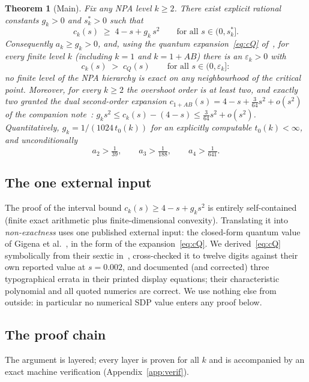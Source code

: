\documentclass[11pt]{article}
\newtheorem{theorem}{Theorem}[section]
\newcommand{\eps}{\varepsilon}
\begin{document}
\begin{theorem}[Main]\label{thm:main}
Fix any NPA level $k\ge2$. There exist explicit rational constants $g_k>0$
and $s^\ast_k>0$ such that
\[
c_k(s)\;\ge\;4-s+g_k\,s^2\qquad\text{for all }s\in(0,s^\ast_k].
\]
Consequently $a_k\ge g_k>0$, and, using the quantum
expansion~\eqref{eq:cQ} of~\cite{Gigena}, for every finite level $k$
(including $k=1$ and $k=1{+}AB$) there is an $\eps_k>0$ with
\[
c_k(s)\;>\;c_Q(s)\qquad\text{for all }s\in(0,\eps_k]:
\]
no finite level of the NPA hierarchy is exact on any neighbourhood of the
critical point. Moreover, for every $k\ge2$ the overshoot order is at least
two, and exactly two granted the dual second-order expansion
$c_{1+AB}(s)=4-s+\tfrac3{64}s^2+o(s^2)$ of the companion
note~\cite{overshoot}:
$g_k s^2\le c_k(s)-(4-s)\le\tfrac3{64}s^2+o(s^2)$.
Quantitatively, $g_k=1/(1024\,t_0(k))$ for an explicitly computable
$t_0(k)<\infty$, and unconditionally
\[
a_2>\tfrac1{39},\qquad a_3>\tfrac1{188},\qquad a_4>\tfrac1{641}.
\]
\end{theorem}

\subsection{The one external input}

The proof of the interval bound $c_k(s)\ge4-s+g_ks^2$ is entirely
self-contained (finite exact arithmetic plus finite-dimensional convexity).
Translating it into \emph{non-exactness} uses one published external input:
the closed-form quantum value of Gigena et al.~\cite{Gigena}, in the form of
the expansion~\eqref{eq:cQ}. We derived~\eqref{eq:cQ} symbolically from
their sextic in~\cite{overshoot}, cross-checked it to twelve digits against
their own reported value at $s=0.002$, and documented (and corrected) three
typographical errata in their printed display equations; their
characteristic polynomial and all quoted numerics are correct. We use
nothing else from outside: in particular no numerical SDP value enters any
proof below.

\subsection{The proof chain}\label{sec:chain}

The argument is layered; every layer is proven for all $k$ and is accompanied by an
exact machine verification (Appendix~\ref{app:verif}).
\end{document}
